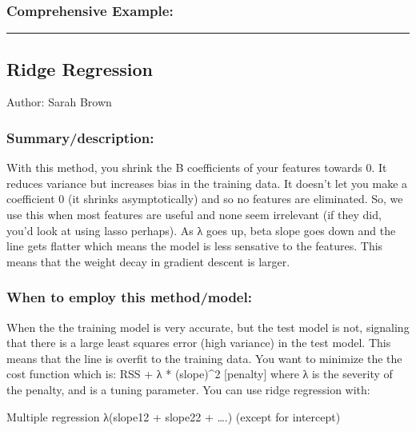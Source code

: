 \documentclass[
]{article}
\begin{document}
\hypertarget{comprehensive-example}{%
\subsubsection{Comprehensive Example:}\label{comprehensive-example}}

\begin{center}\rule{0.5\linewidth}{0.5pt}\end{center}

\hypertarget{ridge-regression}{%
\subsection{Ridge Regression}\label{ridge-regression}}

Author: Sarah Brown

\hypertarget{summarydescription-1}{%
\subsubsection{Summary/description:}\label{summarydescription-1}}

With this method, you shrink the B coefficients of your features towards
0. It reduces variance but increases bias in the training data. It
doesn't let you make a coefficient 0 (it shrinks asymptotically) and so
no features are eliminated. So, we use this when most features are
useful and none seem irrelevant (if they did, you'd look at using lasso
perhaps). As λ goes up, beta slope goes down and the line gets flatter
which means the model is less sensative to the features. This means that
the weight decay in gradient descent is larger.

\hypertarget{when-to-employ-this-methodmodel-1}{%
\subsubsection{When to employ this
method/model:}\label{when-to-employ-this-methodmodel-1}}

When the the training model is very accurate, but the test model is not,
signaling that there is a large least squares error (high variance) in
the test model. This means that the line is overfit to the training
data. You want to minimize the the cost function which is: RSS + λ *
(slope)\^{}2 {[}penalty{]} where λ is the severity of the penalty, and
is a tuning parameter. You can use ridge regression with:

Multiple regression λ(slope12 + slope22 + \ldots.) (except for
intercept)
\end{document}

